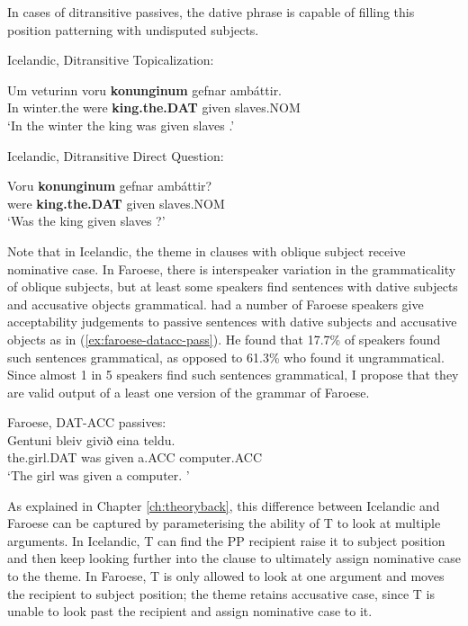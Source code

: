 In cases of ditransitive passives, the dative phrase is capable of filling this position patterning with undisputed subjects.

\begin{exe}
	\ex Icelandic, Ditransitive Topicalization:\label{ex:ice-dittop}
\begin{xlist}
	\ex \gll Um veturinn voru \textbf{konunginum} gefnar amb\'{a}ttir.\\
In winter.the were \textbf{king.the.DAT} given slaves.NOM\\
\trans `In the winter the king was given slaves \citep[ex. 47a]{Zaenen.1985}.'
\end{xlist}
\ex Icelandic, Ditransitive Direct Question:\label{ex:ice-ditdq}
\begin{xlist}
	\ex \gll Voru \textbf{konunginum} gefnar amb\'{a}ttir?\\
were \textbf{king.the.DAT} given slaves.NOM\\
\trans `Was the king given slaves \citep[ex. 48a]{Zaenen.1985}?'
\end{xlist}
\end{exe}

Note that in Icelandic, the theme in clauses with oblique subject receive nominative case. In Faroese, there is interspeaker variation in the grammaticality of oblique subjects, but at least some speakers find sentences with dative subjects and accusative objects grammatical. \cite{Eyorsson.2012} had a number of Faroese speakers give acceptability judgements to passive sentences with dative subjects and accusative objects as in (\ref{ex:faroese-datacc-pass}). He found that 17.7\% of speakers found such sentences grammatical, as opposed to 61.3\% who found it ungrammatical. Since almost 1 in 5 speakers find such sentences grammatical, I propose that they are valid output of a least one version of the grammar of Faroese.

\begin{exe}
	\ex Faroese, DAT-ACC passives:\label{ex:faroese-datacc-pass}\\
	\gll Gentuni bleiv givið eina teldu.\\
the.girl.DAT was given a.ACC computer.ACC\\
\trans `The girl was given a computer. \cite[ex 45b]{Eyorsson.2012}'
\end{exe}

As explained in Chapter \ref{ch:theoryback}, this difference between Icelandic and Faroese can be captured by parameterising the ability of T to look at multiple arguments. In Icelandic, T can find the PP recipient raise it to subject position and then keep looking further into the clause to ultimately assign nominative case to the theme. In Faroese, T is only allowed to look at one argument and moves the recipient to subject position; the theme retains accusative case, since T is unable to look past the recipient and assign nominative case to it.

